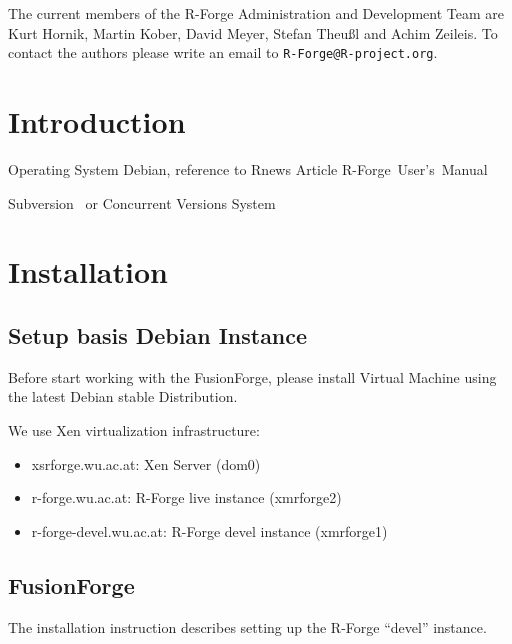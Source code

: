 \documentclass[a4paper]{article}
\newcommand{\RFORGE}{R-Forge Administration and Development Team}
\let\email=\texttt
\begin{document}
\vspace{0.5cm}
The current members of the \RFORGE{} are Kurt Hornik, Martin Kober,
David Meyer, Stefan Theu\ss{}l and Achim Zeileis. To contact the
authors please write an email to \email{R-Forge@R-project.org}.

\newpage

\pagestyle{plain}
\tableofcontents

\clearpage
\pagestyle{headings}
\setcounter{page}{1}

\section{Introduction}

Operating System Debian, reference to Rnews Article
R-Forge~User's~Manual

Subversion~\citep[SVN,
see][]{forge:Pilato+Collins-Sussman+Fitzpatrick:2004} or Concurrent
Versions System~\citep[CVS, see][]{forge:Cederqvist:2006}


\newpage

\section{Installation}
\label{sec:installation}

\subsection{Setup basis Debian Instance}

Before start working with the FusionForge, please install Virtual Machine using the latest
Debian stable Distribution. 

\vspace{0.5cm}
We use Xen virtualization infrastructure:

\begin{itemize}
	\item xsrforge.wu.ac.at: Xen Server (dom0)
	\item r-forge.wu.ac.at: R-Forge live instance (xmrforge2)
	\item r-forge-devel.wu.ac.at: R-Forge devel instance (xmrforge1)
\end{itemize}

\subsection{FusionForge}

The installation instruction describes setting up the R-Forge ``devel'' instance.
\end{document}
